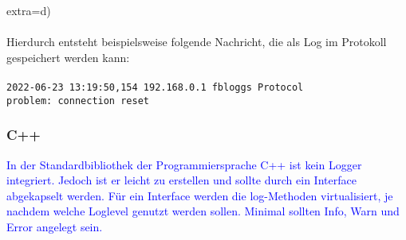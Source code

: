 {{        extra=d)}
    \\
    \\
    Hierdurch entsteht beispielsweise folgende Nachricht, die als Log im Protokoll gespeichert werden kann:
    \\
    \\
    \hspace*{10mm}
    \texttt{2022-06-23 13:19:50,154 192.168.0.1 fbloggs Protocol
    \\
    \hspace*{30mm}
    problem: connection reset}
    \\
}\autocite{docs-python, ionos}

\subsubsection{C++}\label{subsubsec:c++}
\textcolor{blue}{
    In der Standardbibliothek der Programmiersprache C++ ist kein Logger integriert.
    Jedoch ist er leicht zu erstellen und sollte durch ein Interface abgekapselt werden.
    Für ein Interface werden die log-Methoden virtualisiert, je nachdem welche Loglevel genutzt werden sollen.
    Minimal sollten Info, Warn und Error angelegt sein.
}\autocite{c++}

